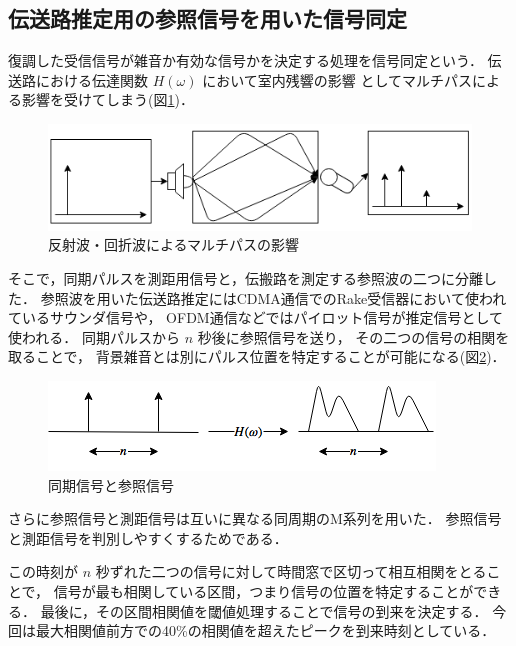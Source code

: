 \subsection{伝送路推定用の参照信号を用いた信号同定}

復調した受信信号が雑音か有効な信号かを決定する処理を信号同定という．
伝送路における伝達関数 $H(\omega)$ において室内残響の影響
としてマルチパスによる影響を受けてしまう(図\ref{fig:multipath})．

\begin{figure}[p]\centering
  \hspace{-2mm}\includegraphics[clip,width=1.1\hsize]{img/multipath.png}
  \caption{反射波・回折波によるマルチパスの影響}\label{fig:multipath}
\end{figure}


そこで，同期パルスを測距用信号と，伝搬路を測定する参照波の二つに分離した．
参照波を用いた伝送路推定にはCDMA通信でのRake受信器において使われているサウンダ信号や，
OFDM通信などではパイロット信号が推定信号として使われる．
同期パルスから $n$ 秒後に参照信号を送り，
その二つの信号の相関を取ることで，
背景雑音とは別にパルス位置を特定することが可能になる(図\ref{fig:sounder})．

\begin{figure}[p]\centering
  \hspace{-2mm}\includegraphics[clip,width=1.1\hsize]{img/sounder.png}
  \caption{同期信号と参照信号}\label{fig:sounder}
\end{figure}

さらに参照信号と測距信号は互いに異なる同周期のM系列を用いた．
参照信号と測距信号を判別しやすくするためである．

この時刻が $n$ 秒ずれた二つの信号に対して時間窓で区切って相互相関をとることで，
信号が最も相関している区間，つまり信号の位置を特定することができる．
最後に，その区間相関値を閾値処理することで信号の到来を決定する．
今回は最大相関値前方での40\%の相関値を超えたピークを到来時刻としている．

